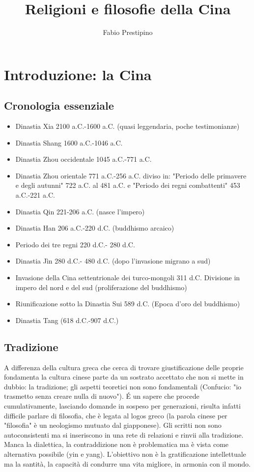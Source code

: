 \documentclass[10pt,a4paper]{report}
\author{Fabio Prestipino}
\title{Religioni e filosofie della Cina}
\begin{document}
	\maketitle
\chapter{Introduzione: la Cina}
\section{Cronologia essenziale}
\begin{itemize}
	\item Dinastia Xia 2100 a.C.-1600 a.C. (quasi leggendaria, poche testimonianze)
	\item Dinastia Shang 1600 a.C.-1046 a.C.
	\item Dinastia Zhou occidentale 1045 a.C.-771 a.C.
	\item Dinastia Zhou orientale 771 a.C.-256 a.C. diviso in: "Periodo delle primavere e degli autunni" 722 a.C. al 481 a.C. e "Periodo dei regni combattenti" 453 a.C.-221 a.C. 
	\item Dinastia Qin 221-206 a.C. (nasce l'impero)
	\item Dinastia Han 206 a.C.-220 d.C. (buddhismo arcaico)
	\item Periodo dei tre regni 220 d.C.- 280 d.C.
	\item Dinastia Jìn 280 d.C.- 480 d.C. (dopo l'invasione migrano a sud)
	\item Invasione della Cina settentrionale dei turco-mongoli 311 d.C. Divisione in impero del nord e del sud (proliferazione del buddhismo)
	\item Riunificazione sotto la Dinastia Sui 589 d.C. (Epoca d'oro del buddhismo)
	\item Dinastia Tang (618 d.C.-907 d.C.)
\end{itemize}
\section{Tradizione}
A differenza della cultura greca che cerca di trovare giustificazione delle proprie fondamenta la cultura cinese parte da un sostrato accettato che non si mette in dubbio: la tradizione; gli aspetti teoretici non sono fondamentali (Confucio: "io trasmetto senza creare nulla di nuovo"). \'E un sapere che procede cumulativamente, lasciando domande in sospeso per generazioni, risulta infatti difficile parlare di filosofia, che è legata al logos greco (la parola cinese per "filosofia" è un neologismo mutuato dal giapponese). Gli scritti non sono autoconsistenti ma si inseriscono in una rete di relazioni e rinvii alla tradizione. Manca la dialettica, la contraddizione non è problematica ma è vista come alternativa possibile (yin e yang). L'obiettivo non è la gratificazione intellettuale ma la santità, la capacità di condurre una vita migliore, in armonia con il mondo.
\end{document}
